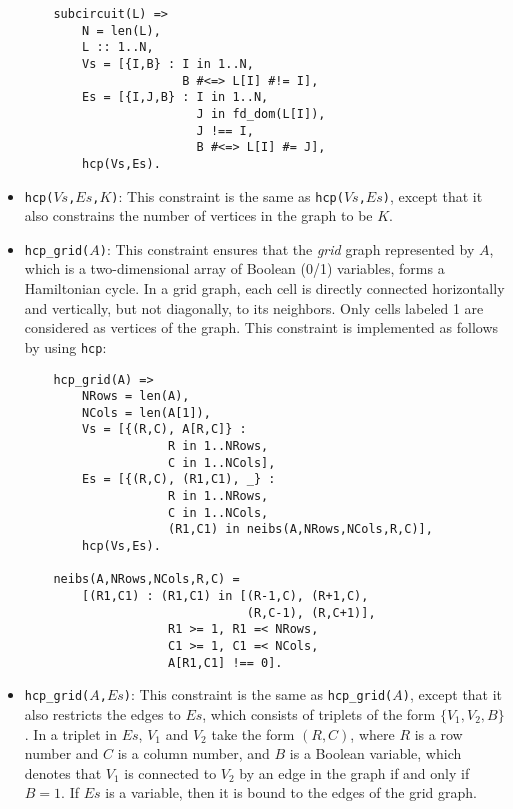 \begin{itemize}
\begin{verbatim}
    subcircuit(L) =>
        N = len(L),
        L :: 1..N,
        Vs = [{I,B} : I in 1..N, 
                      B #<=> L[I] #!= I],
        Es = [{I,J,B} : I in 1..N, 
                        J in fd_dom(L[I]), 
                        J !== I, 
                        B #<=> L[I] #= J],
        hcp(Vs,Es).
\end{verbatim}

\item \texttt{hcp($Vs$,$Es$,$K$)}:  This constraint is the same as \texttt{hcp($Vs$,$Es$)}, except that it also constrains the number of vertices in the graph to be $K$. 

\item \texttt{hcp\_grid($A$)}:  This constraint ensures that the \textit{grid} graph represented by $A$, which is a two-dimensional array of Boolean (0/1) variables, forms a Hamiltonian cycle. In a grid graph, each cell is directly connected horizontally and vertically, but not diagonally, to its neighbors. Only cells labeled 1 are considered as vertices of the graph. This constraint is implemented as follows by using \texttt{hcp}:
\begin{verbatim}
    hcp_grid(A) =>
        NRows = len(A),
        NCols = len(A[1]),
        Vs = [{(R,C), A[R,C]} : 
                    R in 1..NRows, 
                    C in 1..NCols],
        Es = [{(R,C), (R1,C1), _} : 
                    R in 1..NRows, 
                    C in 1..NCols,
                    (R1,C1) in neibs(A,NRows,NCols,R,C)],
        hcp(Vs,Es).

    neibs(A,NRows,NCols,R,C) = 
        [(R1,C1) : (R1,C1) in [(R-1,C), (R+1,C), 
                               (R,C-1), (R,C+1)],
                    R1 >= 1, R1 =< NRows,
                    C1 >= 1, C1 =< NCols, 
                    A[R1,C1] !== 0].
\end{verbatim}

\item \texttt{hcp\_grid($A$,$Es$)}: This constraint is the same as \texttt{hcp\_grid($A$)}, except that it also restricts the edges to $Es$, which consists of triplets of the form $\{V_1,V_2,B\}$. In a triplet in $Es$, $V_1$ and $V_2$ take the form $(R,C)$, where $R$ is a row number and $C$ is a column number, and $B$ is a Boolean variable, which denotes that $V_1$ is connected to $V_2$  by an edge in the graph if and only if $B = 1$. If $Es$ is a variable, then it is bound to the edges of the grid graph.  


\end{itemize}
